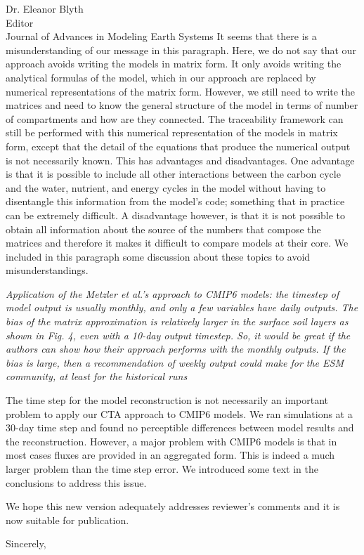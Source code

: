 \documentclass[11pt]{bgcletter}
\begin{document}
\begin{letter}{Dr. Eleanor Blyth\\
 Editor \\ Journal of Advances in Modeling Earth Systems}
{\color{blue} It seems that there is a misunderstanding of our message in this paragraph. Here, we do not say that our approach avoids writing the models in matrix form. It only avoids writing the analytical formulas of the model, which in our approach are replaced by numerical representations of the matrix form. However, we still need to write the matrices and need to know the general structure of the model in terms of number of compartments and how are they connected. The traceability framework can still be performed with this numerical representation of the models in matrix form, except that the detail of the equations that produce the numerical output is not necessarily known. This has advantages and disadvantages. One advantage is that it is possible to include all other interactions between the carbon cycle and the water, nutrient, and energy cycles in the model without having to disentangle this information from the model's code; something that in practice can be extremely difficult. A disadvantage however, is that it is not possible to obtain all information about the source of the numbers that compose the matrices and therefore it makes it difficult to compare models at their core. We included in this paragraph some discussion about these topics to avoid misunderstandings. }

{\it Application of the Metzler et al.'s approach to CMIP6 models: the timestep of model output is usually monthly, and only a few variables have daily outputs. The bias of the matrix approximation is relatively larger in the surface soil layers as shown in Fig. 4, even with a 10-day output timestep. So, it would be great if the authors can show how their approach performs with the monthly outputs. If the bias is large, then a recommendation of weekly output could make for the ESM community, at least for the historical runs}

{\color{blue} The time step for the model reconstruction is not necessarily an important problem to apply our CTA approach to CMIP6 models. We ran simulations at a 30-day time step and found no perceptible differences between model results and the reconstruction. However, a major problem with CMIP6 models is that in most cases fluxes are provided in an aggregated form. This is indeed a much larger problem than the time step error. We introduced some text in the conclusions to address this issue.}

\vspace{2em}
We hope this new version adequately addresses reviewer's comments and it is now suitable for publication.

\closing{Sincerely,}
 \end{letter}

 
\end{document}
